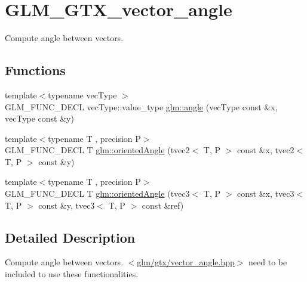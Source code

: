 \hypertarget{group__gtx__vector__angle}{\section{G\-L\-M\-\_\-\-G\-T\-X\-\_\-vector\-\_\-angle}
\label{group__gtx__vector__angle}
}


Compute angle between vectors.  


\subsection*{Functions}
\begin{DoxyCompactItemize}
\item 
{\footnotesize template$<$typename vec\-Type $>$ }\\G\-L\-M\-\_\-\-F\-U\-N\-C\-\_\-\-D\-E\-C\-L vec\-Type\-::value\-\_\-type \hyperlink{group__gtx__vector__angle_gab8691008a2536b681b711211816c14f7}{glm\-::angle} (vec\-Type const \&x, vec\-Type const \&y)
\item 
{\footnotesize template$<$typename T , precision P$>$ }\\G\-L\-M\-\_\-\-F\-U\-N\-C\-\_\-\-D\-E\-C\-L T \hyperlink{group__gtx__vector__angle_ga82a19d474be13c92c7b10caab42a5a72}{glm\-::oriented\-Angle} (tvec2$<$ T, P $>$ const \&x, tvec2$<$ T, P $>$ const \&y)
\item 
{\footnotesize template$<$typename T , precision P$>$ }\\G\-L\-M\-\_\-\-F\-U\-N\-C\-\_\-\-D\-E\-C\-L T \hyperlink{group__gtx__vector__angle_ga7254dba112eff55f55f9544f41cb9ece}{glm\-::oriented\-Angle} (tvec3$<$ T, P $>$ const \&x, tvec3$<$ T, P $>$ const \&y, tvec3$<$ T, P $>$ const \&ref)
\end{DoxyCompactItemize}


\subsection{Detailed Description}
Compute angle between vectors. $<$\hyperlink{vector__angle_8hpp}{glm/gtx/vector\-\_\-angle.\-hpp}$>$ need to be included to use these functionalities. 

